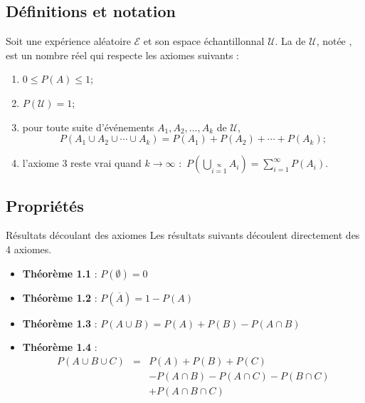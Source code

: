 \documentclass{BeamerTemplate}
\begin{document}
\subsection{Définitions et notation}

\begin{frame}[t]

\begin{defn}{}
  Soit une expérience aléatoire $\mathcal{E}$ et son espace échantillonnal
  $\mathcal{U}$. La  de $\mathcal{U}$,
  notée , est un nombre réel qui respecte les axiomes suivants :
  \begin{enumerate}
   \item $0\le P(A)\le 1$;
   \item $P(\mathcal{U})=1$;
   \item pour toute suite d'événements 
   $A_1,A_2,\ldots,A_k$ de $\mathcal{U}$,
   $$P(A_1\cup A_2\cup \cdots \cup A_k)=P(A_1)+P(A_2)+\cdots+P(A_k);$$
   \item l'axiome 3 reste vrai quand $k\to\infty$ :\ $P\left(\bigcup_{i=1}\limits^\infty A_i\right)=\sum\limits_{i=1}^\infty P(A_i)$.
  \end{enumerate}
 \end{defn}

\end{frame}

\subsection{Propriétés}

\begin{frame}[t]{Résultats découlant des axiomes}
Les résultats suivants découlent directement des 4 axiomes.
 \begin{itemize}
  \item<1->{\bf Théorème 1.1} : $P(\emptyset)=0$

  {\color{gray}{[$\mathcal{U}$ et $\emptyset$ sont mutuellement
  exclusifs, $\mathcal{U}\cup\emptyset=\mathcal{U}$ et $P(\mathcal{U})=1$...]}}
  \item<2->{\bf Théorème 1.2} : $P(\overline{A})=1-P(A)$

  {\color{gray}{[$A$ et $\overline{A}$ sont mutuellement
  exclusifs et $A\cup\overline{A}=\mathcal{U}$...]}}
  \item<3->{\bf Théorème 1.3} : $P(A\cup B)=P(A)+P(B)-P(A\cap B)$

  \item<4->{\bf Théorème 1.4} :
  $$\begin{array}{lll}
  P(A\cup B\cup C)&=&P(A)+P(B)+P(C)\\&&-P(A\cap B)
   -P(A\cap C)-P(B\cap C)\\&&+P(A\cap B\cap C)\end{array}$$

 \end{itemize}
\end{frame}
\end{document}
